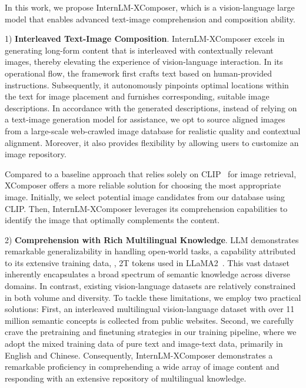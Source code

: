 \documentclass[10pt,twocolumn,letterpaper]{article}
\begin{document}
In this work, we propose InternLM-XComposer, which is a vision-language large model that enables advanced text-image comprehension and composition ability.

1) \textbf{Interleaved Text-Image Composition}.
InternLM-XComposer excels in generating long-form content that is interleaved with contextually relevant images, thereby elevating the experience of vision-language interaction. In its operational flow, the framework first crafts text based on human-provided instructions. Subsequently, it autonomously pinpoints optimal locations within the text for image placement and furnishes corresponding, suitable image descriptions. 
In accordance with the generated descriptions, instead of relying on a text-image generation model for assistance, we opt to source aligned images from a large-scale web-crawled image database for realistic quality and contextual alignment. Moreover, it also provides flexibility by allowing users to customize an image repository.

Compared to a baseline approach that relies solely on CLIP~\cite{radford2021learning,Yang2022ChineseCC} for image retrieval, XComposer offers a more reliable solution for choosing the most appropriate image. Initially, we select potential image candidates from our database using CLIP. Then, InternLM-XComposer leverages its comprehension capabilities to identify the image that optimally complements the content.
   
2) \textbf{Comprehension with Rich Multilingual Knowledge}. 
LLM demonstrates remarkable generalizability in handling open-world tasks, a capability attributed to its extensive training data, \eg, 2T tokens used in LLaMA2~\cite{touvron2023llama2}. This vast dataset inherently encapsulates a broad spectrum of semantic knowledge across diverse domains. In contrast, existing vision-language datasets are relatively constrained in both volume and diversity. To tackle these limitations, we employ two practical solutions: First, an interleaved multilingual vision-language dataset with over 11 million semantic concepts is collected from public websites. Second, we carefully crave the pretraining and finetuning strategies in our training pipeline, where we adopt the mixed training data of pure text and image-text data, primarily in English and Chinese.
Consequently, InternLM-XComposer demonstrates a remarkable proficiency in comprehending a wide array of image content and responding with an extensive repository of multilingual knowledge. 
\end{document}

